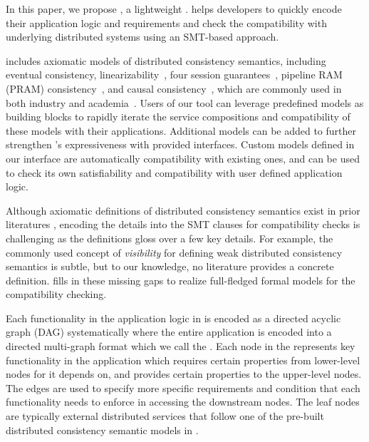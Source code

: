 In this paper, we propose \sysname{}, a lightweight \sysnamelong{}. \sysname{}
helps developers to quickly encode their application logic and
requirements and check the compatibility with underlying distributed
systems using an SMT-based approach.

\sysname{} includes axiomatic models of distributed consistency
semantics, including eventual consistency,
linearizability~\cite{viotti2016consistency}, four session
guarantees~\cite{terry1994session}, pipeline RAM (PRAM) consistency~\cite{pram},
and causal consistency~\cite{causaldef}, which are commonly used in both
industry and academia~\cite{pileus, cosmosdb, anna, bayou, yogurt,
pnuts, cloudflare-session, causalmemory, cops}.
Users of our tool can leverage predefined models as
building blocks to rapidly iterate the service compositions and compatibility
of these models with their applications. Additional models can be
added to further
strengthen \sysname{}'s expressiveness with provided interfaces.
Custom models defined in our interface are automatically
compatibility with existing ones,
and can be used to check its own satisfiability and compatibility
with user defined application logic.

Although axiomatic definitions of distributed consistency semantics
exist in prior literatures \cite{finkbeiner2007smt,
  tekken2017monitoring, kuper2019toward, fan2023satisfiability,
ma2024noctua}, encoding the details into the SMT
clauses for compatibility checks is challenging as the definitions
gloss over a few key details. For example, the commonly used concept
of \textit{visibility} for defining weak distributed consistency
semantics is subtle, but to our knowledge, no literature provides
a concrete definition. \sysname{} fills in these missing gaps to realize
full-fledged formal models for the compatibility checking.

Each functionality in the application logic in \sysname{} is encoded
as a directed acyclic graph (DAG) systematically where the entire
application is encoded into a directed multi-graph format which
we call the \sysgraph{}.
Each node in the \sysgraph{} represents key functionality in the
application which requires certain properties from lower-level nodes
for it depends on, and provides certain properties to the upper-level nodes.
The edges are used to specify more specific requirements and condition that each
functionality needs to enforce in accessing the downstream nodes.
The leaf nodes are typically external distributed services that
follow one of the pre-built distributed consistency semantic models
in \sysname{}.

